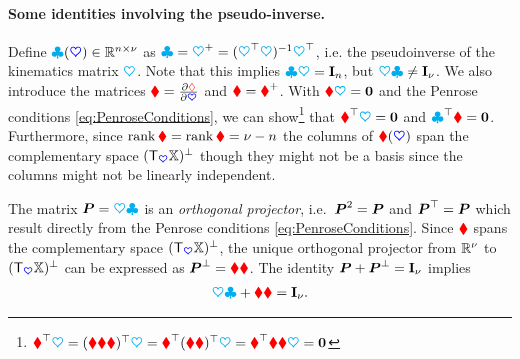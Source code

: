 \paragraph{Some identities involving the pseudo-inverse.}
Define $\kinBasisMat(\sysCoord) \in \RealNum^{\dimConfigSpace\times\numCoord}$ as $\kinBasisMat = \kinMat^+ = (\kinMat^\top \kinMat)^{-1} \kinMat^\top$, i.e. the pseudoinverse of the kinematics matrix $\kinMat$.
Note that this implies $\kinBasisMat \kinMat = \idMat[\dimConfigSpace]$, but $\kinMat \kinBasisMat \neq \idMat[\numCoord]$.
We also introduce the matrices $\geoConstraintMat = \pdiff[\geoConstraint]{\sysCoord}$ and $\InvGeoConstraintMat = \geoConstraintMat^+$.
With $\geoConstraintMat\kinMat = \mat{0}$ and the Penrose conditions \eqref{eq:PenroseConditions}, we can show\footnote{$\InvGeoConstraintMat^\top \kinMat = (\InvGeoConstraintMat \geoConstraintMat \InvGeoConstraintMat)^\top \kinMat = \InvGeoConstraintMat^\top (\InvGeoConstraintMat \geoConstraintMat)^\top \kinMat = \InvGeoConstraintMat^\top \InvGeoConstraintMat \geoConstraintMat \kinMat = \mat{0}$} that $\InvGeoConstraintMat^\top \kinMat = \mat{0}$ and $\kinBasisMat^\top \geoConstraintMat = \mat{0}$.
Furthermore, since $\rank\InvGeoConstraintMat = \rank\geoConstraintMat = \numCoord - \dimConfigSpace$ the columns of $\InvGeoConstraintMat(\sysCoord)$ span the complementary space $(\Tangent[\sysCoord]\configSpace)^\bot$ though they might not be a basis since the columns might not be linearly independent.

The matrix $\mat{P} = \kinMat \kinBasisMat$ is an \textit{orthogonal projector}, i.e.\ $\mat{P}^2 = \mat{P}$ and $\mat{P}^\top = \mat{P}$ which result directly from the Penrose conditions \eqref{eq:PenroseConditions}.
Since $\InvGeoConstraintMat$ spans the complementary space $(\Tangent[\sysCoord]\configSpace)^\bot$, the unique orthogonal projector from $\RealNum^\numCoord$ to $(\Tangent[\sysCoord]\configSpace)^\bot$ can be expressed as $\mat{P}^\bot = \InvGeoConstraintMat \geoConstraintMat$.
The identity $\mat{P} + \mat{P}^\bot = \idMat[\numCoord]$ implies
\begin{align}\label{eq:ProjectionIdentity}
 \kinMat \kinBasisMat + \InvGeoConstraintMat \geoConstraintMat = \idMat[\numCoord].
\end{align}

